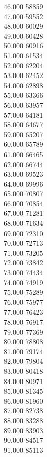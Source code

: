 { 46.000	58859 \\
 47.000	59552 \\
 48.000	60029 \\
 49.000	60428 \\
 50.000	60916 \\
 51.000	61534 \\
 52.000	62204 \\
 53.000	62452 \\
 54.000	62898 \\
 55.000	63366 \\
 56.000	63957 \\
 57.000	64181 \\
 58.000	64677 \\
 59.000	65207 \\
 60.000	65789 \\
 61.000	66465 \\
 62.000	66744 \\
 63.000	69523 \\
 64.000	69996 \\
 65.000	70807 \\
 66.000	70854 \\
 67.000	71281 \\
 68.000	71634 \\
 69.000	72310 \\
 70.000	72713 \\
 71.000	73205 \\
 72.000	73842 \\
 73.000	74434 \\
 74.000	74919 \\
 75.000	75289 \\
 76.000	75977 \\
 77.000	76423 \\
 78.000	76917 \\
 79.000	77369 \\
 80.000	78808 \\
 81.000	79174 \\
 82.000	79804 \\
 83.000	80418 \\
 84.000	80971 \\
 85.000	81345 \\
 86.000	81960 \\
 87.000	82738 \\
 88.000	83288 \\
 89.000	83903 \\
 90.000	84517 \\
 91.000	85113 \\
}
